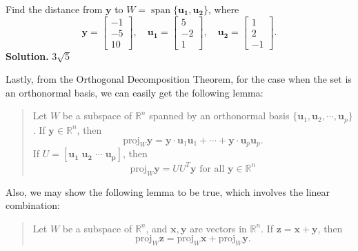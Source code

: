 \documentclass[10pt, a4paper]{article}
\newcommand{\R}{\mathbb{R}}
\newcommand{\vt}[1]{\mathbf{#1}}
\begin{document}
\begin{example}
    Find the distance from $\vt{y}$ to $W=\operatorname*{span}\{\vt{u_1},\vt{u_2}\}$, where\[
    \vt{y}=\begin{bmatrix}
        -1\\-5\\10
    \end{bmatrix}, \quad \vt{u_1}=\begin{bmatrix}
        5\\-2\\1
    \end{bmatrix}, \quad \vt{u_2}=\begin{bmatrix}
        1\\2\\-1
    \end{bmatrix}.
    \]
    \textbf{Solution.} $3\sqrt{5}$
\end{example}
\indent Lastly, from the Orthogonal Decomposition Theorem, for the case when the set is an orthonormal basis, we can easily get the following lemma:
\begin{quotation}
    Let $W$ be a subspace of $\R^n$ spanned by an orthonormal basis $\{\vt{u}_1, \vt{u}_2, \cdots, \vt{u}_p\}$. If $\vt{y}\in\R^n$, then $$\text{proj}_W\vt{y} = \vt{y}\cdot\vt{u}_1\vt{u}_1+\cdots+\vt{y}\cdot\vt{u}_p\vt{u}_p.$$
    If $U=[\vt{u_1}\; \vt{u_2}\; \cdots \; \vt{u_p}]$, then $$\text{proj}_W\vt{y} = UU^T\vt{y} \text{ for all }\vt{y}\in \R^n$$
\end{quotation}
\indent Also, we may show the following lemma to be true, which involves the linear combination:
\begin{quotation}
    Let $W$ be a subspace of $\R^n$, and $\vt{x},\vt{y}$ are vectors in $\R^n$. If $\vt{z}=\vt{x}+\vt{y}$, then\[
    \text{proj}_W\vt{z} = \text{proj}_W\vt{x} + \text{proj}_W\vt{y}.
    \]
\end{quotation}
\end{document}
